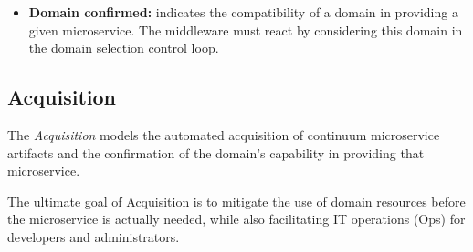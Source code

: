\begin{itemize}
	
	\item \textbf{Domain confirmed:} indicates the compatibility of a domain in providing a given microservice. The middleware must react by considering this domain in the domain selection control loop.
	
\end{itemize}





\subsection{Acquisition}\label{sec:A3-E-acquisition}


The \textit{Acquisition} models the automated acquisition of continuum microservice artifacts and the confirmation of the domain's capability in providing that microservice.

The ultimate goal of Acquisition is to mitigate the use of domain resources before the microservice is actually needed, while also facilitating IT operations (Ops) for developers and administrators. 

